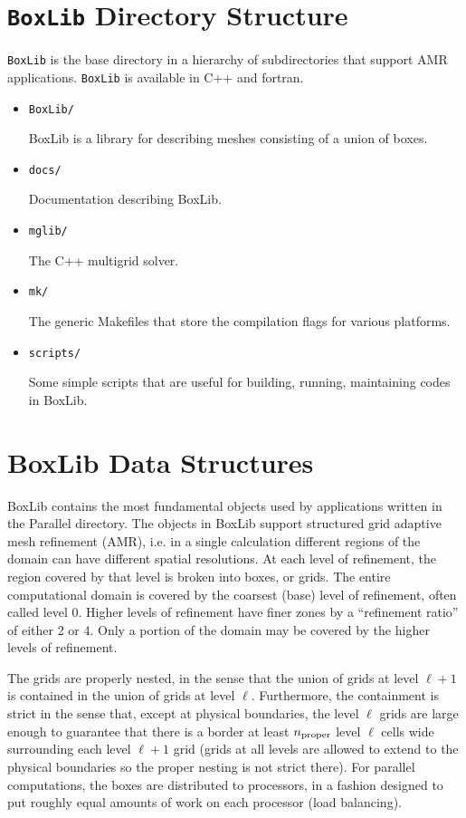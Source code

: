 \section{{\tt BoxLib} Directory Structure}

{\tt BoxLib} is the base directory in a hierarchy of subdirectories that
support AMR applications.  {\tt BoxLib} is available in C++ and fortran.

\begin{itemize}
\item {\tt BoxLib/} 

 BoxLib is a library for describing meshes consisting of a union
 of boxes.

\item {\tt docs/}

 Documentation describing BoxLib.

\item {\tt mglib/}

  The C++ multigrid solver.

\item {\tt mk/}

  The generic Makefiles that store the compilation flags for
  various platforms.

\item {\tt scripts/}

  Some simple scripts that are useful for building, running,
  maintaining codes in BoxLib.

\end{itemize}

\section{BoxLib Data Structures}

BoxLib contains the most fundamental objects used by applications written
in the Parallel directory. The objects in BoxLib support structured
grid adaptive mesh refinement (AMR), i.e. in a single calculation
different regions of the domain can have different spatial resolutions.  
At each level of refinement, the region covered by that level is broken
into boxes, or grids.  The entire computational domain is covered by
the coarsest (base) level of refinement, often called level 0. 
Higher levels of refinement have finer zones by a ``refinement ratio''
of either 2 or 4.  Only a portion of the domain may
be covered by the higher levels of refinement.  

The grids are properly nested, in the sense that the union of grids
at level $\ell+1$ is contained in the union of grids at level $\ell$.
Furthermore, the containment is strict in the sense that,
except at physical boundaries,
the level $\ell$ grids are large enough to guarantee that there is
a border at least $n_{\rm proper}$ level $\ell$ cells wide surrounding each level
$\ell +1$ grid (grids at all levels are allowed to extend to the physical
boundaries so the proper nesting is not strict there).
For parallel computations, the boxes are distributed to processors, in
a fashion designed to put roughly equal amounts of work on each
processor (load balancing).

